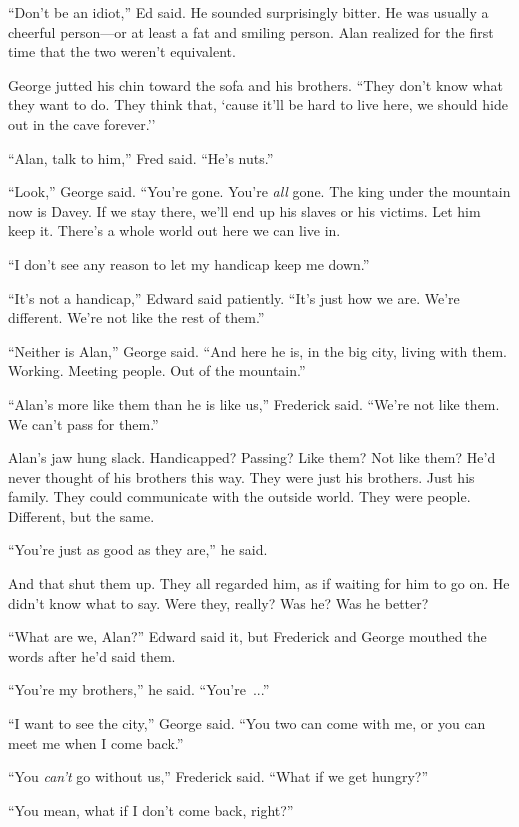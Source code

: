 \documentclass{article}
\begin{document}
``Don't be an idiot,'' Ed said.  He sounded surprisingly bitter.  He
was usually a cheerful person---or at least a fat and smiling person. 
Alan realized for the first time that the two weren't equivalent.

George jutted his chin toward the sofa and his brothers.  ``They don't
know what they want to do.  They think that, `cause it'll be hard to
live here, we should hide out in the cave forever.''

``Alan, talk to him,'' Fred said.  ``He's nuts.''

``Look,'' George said.  ``You're gone.  You're \textit{all} gone.  The
king under the mountain now is Davey.  If we stay there, we'll end up
his slaves or his victims.  Let him keep it.  There's a whole world
out here we can live in.

``I don't see any reason to let my handicap keep me down.''

``It's not a handicap,'' Edward said patiently.  ``It's just how we
are.  We're different.  We're not like the rest of them.''

``Neither is Alan,'' George said.  ``And here he is, in the big city,
living with them.  Working.  Meeting people.  Out of the mountain.''

``Alan's more like them than he is like us,'' Frederick said.  ``We're
not like them.  We can't pass for them.''

Alan's jaw hung slack.  Handicapped?  Passing?  Like them?  Not like
them?  He'd never thought of his brothers this way.  They were just
his brothers.  Just his family.  They could communicate with the
outside world.  They were people.  Different, but the same.

``You're just as good as they are,'' he said.

And that shut them up.  They all regarded him, as if waiting for him
to go on.  He didn't know what to say.  Were they, really?  Was he? 
Was he better?

``What are we, Alan?'' Edward said it, but Frederick and George
mouthed the words after he'd said them.

``You're my brothers,'' he said.  ``You're~...''

``I want to see the city,'' George said.  ``You two can come with me,
or you can meet me when I come back.''

``You \textit{can't} go without us,'' Frederick said.  ``What if we
get hungry?''

``You mean, what if I don't come back, right?''
\end{document}
